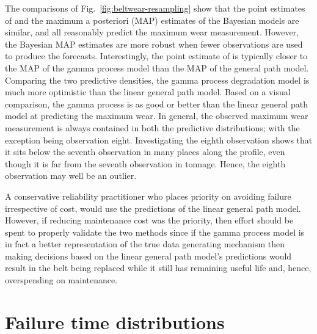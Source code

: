 The comparisons of Fig.~\ref{fig:beltwear-resampling} show that the point estimates of \citet{webb_2020} and the maximum a posteriori (MAP) estimates of the Bayesian models are similar, and all reasonably predict the maximum wear measurement. However, the Bayesian MAP estimates are more robust when fewer observations are used to produce the forecasts. Interestingly, the point estimate of \citet{webb_2020} is typically closer to the MAP of the gamma process model than the MAP of the general path model. Comparing the two predictive densities, the gamma process degradation model is much more optimistic than the linear general path model. Based on a visual comparison, the gamma process is as good or better than the linear general path model at predicting the maximum wear. In general, the observed maximum wear measurement is always contained in both the predictive distributions; with the exception being observation eight. Investigating the eighth observation shows that it sits below the seventh observation in many places along the profile, even though it is far from the seventh observation in tonnage. Hence, the eighth observation may well be an outlier.

A conservative reliability practitioner who places priority on avoiding failure irrespective of cost, would use the predictions of the linear general path model. However, if reducing maintenance cost was the priority, then effort should be spent to properly validate the two methods since if the gamma process model is in fact a better representation of the true data generating mechanism then making decisions based on the linear general path model's predictions would result in the belt being replaced while it still has remaining useful life and, hence, overspending on maintenance.

\section{Failure time distributions} \label{sec:belt-wear-ft}

